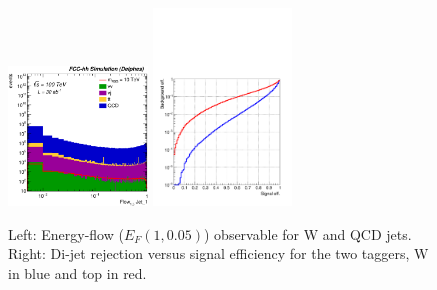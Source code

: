\documentclass{cernrep}
\begin{document}
\begin{figure}[!htbp]\centering
\includegraphics[width=0.33\textwidth]{Fig/TMVA/Jet1_Flow15_sel0_nostack_logx.eps}
\includegraphics[width=0.33\textwidth,trim={0 0.5cm 0 0},clip]{Fig/TMVA/effQCD_vs_effWhadBlue_thadRed_log.pdf}
\caption{Left: Energy-flow ($E_{F}(1,0.05)$) observable for W and QCD jets. Right: Di-jet rejection versus signal efficiency for the two taggers, W in blue and top in red.}
\label{fig:TMVA_final_result}
\end{figure}


\end{document}
